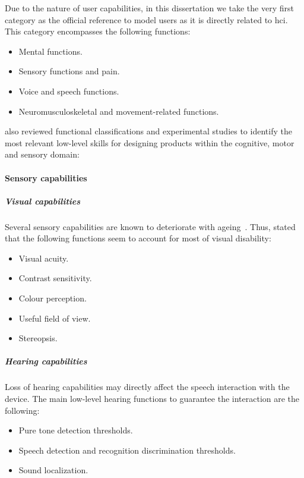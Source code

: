 Due to the nature of user capabilities, in this dissertation we take the very 
first category as the official reference to model users as it is directly 
related to \ac{hci}. This category encompasses the following functions:

\begin{itemize}
  \item Mental functions.
  \item Sensory functions and pain.
  \item Voice and speech functions.
  \item Neuromusculoskeletal and movement-related functions.
\end{itemize}


\citeauthor{persad_cognitive_2007} also reviewed functional classifications 
and experimental studies to identify the most relevant low-level skills for 
designing products within the cognitive, motor and sensory domain:

\paragraph*{Sensory capabilities}
\subparagraph*{Visual capabilities} Several sensory capabilities are known to 
deteriorate with ageing~\citep{persad_exploring_2006}. Thus, 
\citeauthor{persad_exploring_2006} stated that the following functions seem to 
account for most of visual disability:

\begin{itemize}
  \item Visual acuity.
  \item Contrast sensitivity.
  \item Colour perception.
  \item Useful field of view.
  \item Stereopsis.
\end{itemize}


\subparagraph*{Hearing capabilities} Loss of hearing capabilities may directly 
affect the speech interaction with the device. The main low-level hearing 
functions to guarantee the interaction are the following:

\begin{itemize}
  \item Pure tone detection thresholds.
  \item Speech detection and recognition discrimination thresholds.
  \item Sound localization.
\end{itemize}

